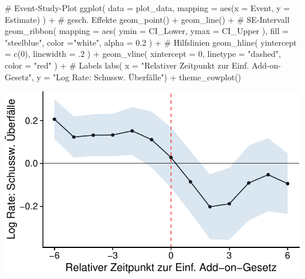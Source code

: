 \documentclass[
  a4paper,
  DIV=11,
  oneside]{scrreprt}
\newenvironment{Shaded}{\begin{snugshade}}{\end{snugshade}}
\newcommand{\AttributeTok}[1]{\textcolor[rgb]{0.40,0.45,0.13}{#1}}
\newcommand{\CommentTok}[1]{\textcolor[rgb]{0.37,0.37,0.37}{#1}}
\newcommand{\DecValTok}[1]{\textcolor[rgb]{0.68,0.00,0.00}{#1}}
\newcommand{\FloatTok}[1]{\textcolor[rgb]{0.68,0.00,0.00}{#1}}
\newcommand{\FunctionTok}[1]{\textcolor[rgb]{0.28,0.35,0.67}{#1}}
\newcommand{\NormalTok}[1]{\textcolor[rgb]{0.00,0.23,0.31}{#1}}
\newcommand{\SpecialCharTok}[1]{\textcolor[rgb]{0.37,0.37,0.37}{#1}}
\newcommand{\StringTok}[1]{\textcolor[rgb]{0.13,0.47,0.30}{#1}}
\begin{document}
\begin{Shaded}
\begin{Highlighting}[]
\CommentTok{\# Event{-}Study{-}Plot}
\FunctionTok{ggplot}\NormalTok{(}
  \AttributeTok{data =}\NormalTok{ plot\_data, }
  \AttributeTok{mapping =} \FunctionTok{aes}\NormalTok{(}\AttributeTok{x =}\NormalTok{ Event, }\AttributeTok{y =}\NormalTok{ Estimate)}
\NormalTok{) }\SpecialCharTok{+}
  \CommentTok{\# gesch. Effekte}
  \FunctionTok{geom\_point}\NormalTok{() }\SpecialCharTok{+}
  \FunctionTok{geom\_line}\NormalTok{() }\SpecialCharTok{+}
  \CommentTok{\# SE{-}Intervall}
  \FunctionTok{geom\_ribbon}\NormalTok{(}
    \AttributeTok{mapping =} \FunctionTok{aes}\NormalTok{(}
      \AttributeTok{ymin =}\NormalTok{ CI\_Lower, }
      \AttributeTok{ymax =}\NormalTok{ CI\_Upper}
\NormalTok{    ),}
    \AttributeTok{fill =} \StringTok{"steelblue"}\NormalTok{,}
    \AttributeTok{color =}\StringTok{"white"}\NormalTok{,}
    \AttributeTok{alpha =} \FloatTok{0.2}
\NormalTok{  ) }\SpecialCharTok{+}
  \CommentTok{\# Hilfslinien}
  \FunctionTok{geom\_hline}\NormalTok{(}
    \AttributeTok{yintercept =} \FunctionTok{c}\NormalTok{(}\DecValTok{0}\NormalTok{), }
    \AttributeTok{linewidth =}\NormalTok{ .}\DecValTok{2}
\NormalTok{  ) }\SpecialCharTok{+}
  \FunctionTok{geom\_vline}\NormalTok{(}
    \AttributeTok{xintercept =} \DecValTok{0}\NormalTok{, }
    \AttributeTok{linetype =} \StringTok{"dashed"}\NormalTok{, }
    \AttributeTok{color =} \StringTok{"red"}
\NormalTok{  ) }\SpecialCharTok{+}
  \CommentTok{\# Labels}
  \FunctionTok{labs}\NormalTok{(}
    \AttributeTok{x =} \StringTok{"Relativer Zeitpunkt zur Einf. Add{-}on{-}Gesetz"}\NormalTok{,}
    \AttributeTok{y =} \StringTok{"Log Rate: Schussw. Überfälle"}\NormalTok{) }\SpecialCharTok{+}
  \FunctionTok{theme\_cowplot}\NormalTok{()}
\end{Highlighting}
\end{Shaded}

\includegraphics{EventStudies_files/figure-pdf/unnamed-chunk-12-1.pdf}
\end{document}
